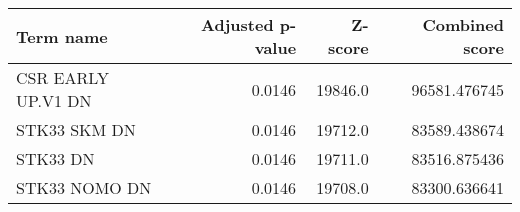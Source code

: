 \begin{tabular}{lrrr}
\toprule
         Term name &  Adjusted p-value &  Z-score &  Combined score \\
\midrule
CSR EARLY UP.V1 DN &            0.0146 &  19846.0 &    96581.476745 \\
      STK33 SKM DN &            0.0146 &  19712.0 &    83589.438674 \\
          STK33 DN &            0.0146 &  19711.0 &    83516.875436 \\
     STK33 NOMO DN &            0.0146 &  19708.0 &    83300.636641 \\
\bottomrule
\end{tabular}
